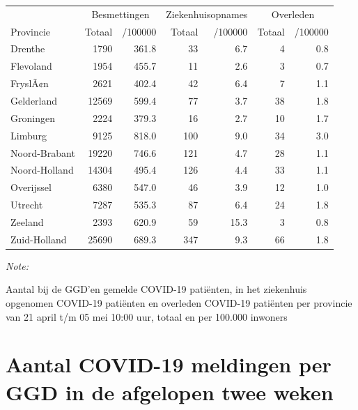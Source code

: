 \documentclass[
  english,
  man,floatsintext]{apa6}
\begin{document}
\begin{table}
\centering
\begin{threeparttable}
\begin{tabular}{lrrrrrr}
\toprule
\multicolumn{1}{c}{ } & \multicolumn{2}{c}{Besmettingen} & \multicolumn{2}{c}{Ziekenhuisopnames} & \multicolumn{2}{c}{Overleden} \\
\cmidrule(l{3pt}r{3pt}){2-3} \cmidrule(l{3pt}r{3pt}){4-5} \cmidrule(l{3pt}r{3pt}){6-7}
Provincie & Totaal & /100000 & Totaal & /100000 & Totaal & /100000\\
\midrule
Drenthe & 1790 & 361.8 & 33 & 6.7 & 4 & 0.8\\
Flevoland & 1954 & 455.7 & 11 & 2.6 & 3 & 0.7\\
FryslÃ¢n & 2621 & 402.4 & 42 & 6.4 & 7 & 1.1\\
Gelderland & 12569 & 599.4 & 77 & 3.7 & 38 & 1.8\\
Groningen & 2224 & 379.3 & 16 & 2.7 & 10 & 1.7\\
Limburg & 9125 & 818.0 & 100 & 9.0 & 34 & 3.0\\
Noord-Brabant & 19220 & 746.6 & 121 & 4.7 & 28 & 1.1\\
Noord-Holland & 14304 & 495.4 & 126 & 4.4 & 33 & 1.1\\
Overijssel & 6380 & 547.0 & 46 & 3.9 & 12 & 1.0\\
Utrecht & 7287 & 535.3 & 87 & 6.4 & 24 & 1.8\\
Zeeland & 2393 & 620.9 & 59 & 15.3 & 3 & 0.8\\
Zuid-Holland & 25690 & 689.3 & 347 & 9.3 & 66 & 1.8\\
\bottomrule
\end{tabular}
\begin{tablenotes}
\item \textit{Note: } 
\item Aantal bij de GGD’en gemelde COVID-19 patiënten, in het ziekenhuis opgenomen COVID-19 patiënten en overleden COVID-19 patiënten per provincie van 21 april t/m 05 mei 10:00 uur, totaal en per 100.000 inwoners
\end{tablenotes}
\end{threeparttable}
\end{table}

\newpage

\hypertarget{aantal-covid-19-meldingen-per-ggd-in-de-afgelopen-twee-weken}{%
\section{Aantal COVID-19 meldingen per GGD in de afgelopen twee weken}\label{aantal-covid-19-meldingen-per-ggd-in-de-afgelopen-twee-weken}}
\end{document}
